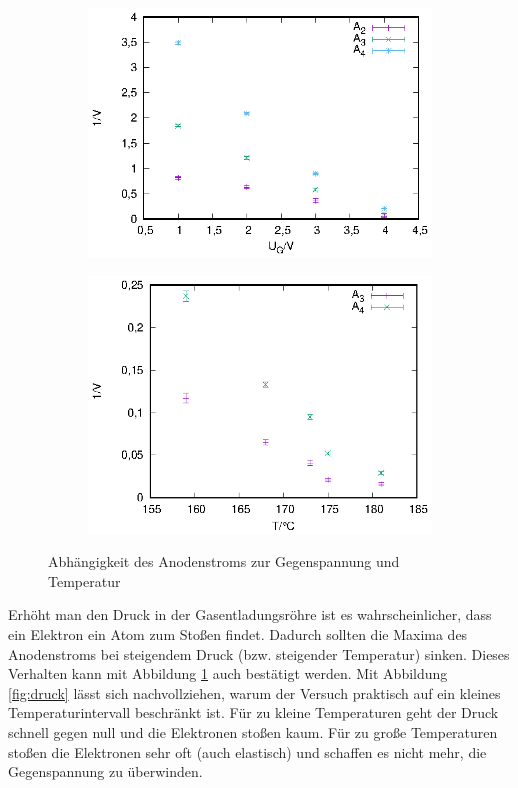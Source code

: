 \begin{figure}[h]
  \centering
  \begin{subfigure}[h]{0.5\textwidth}
    \centering
    \includegraphics{data/fh/abh_u.eps}
  \end{subfigure}%
  \begin{subfigure}[h]{0.5\textwidth}
    \centering
    \includegraphics{data/fh/abh_t.eps}
  \end{subfigure}
  \caption{Abhängigkeit des Anodenstroms zur Gegenspannung und Temperatur}
  \label{fig:abh}
\end{figure}

Erhöht man den Druck in der Gasentladungsröhre ist es wahrscheinlicher, dass ein Elektron ein Atom zum Stoßen findet. Dadurch sollten die Maxima des Anodenstroms bei steigendem Druck (bzw. steigender Temperatur) sinken. Dieses Verhalten kann mit Abbildung \ref{fig:abh} auch bestätigt werden. Mit Abbildung \ref{fig:druck} lässt sich nachvollziehen, warum der Versuch praktisch auf ein kleines Temperaturintervall beschränkt ist. Für zu kleine Temperaturen geht der Druck schnell gegen null und die Elektronen stoßen kaum. Für zu große Temperaturen stoßen die Elektronen sehr oft (auch elastisch) und schaffen es nicht mehr, die Gegenspannung zu überwinden.


